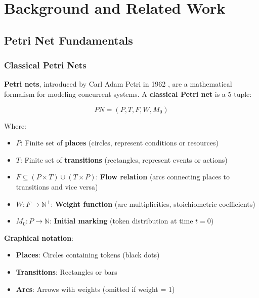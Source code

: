 \chapter{Background and Related Work}
\label{ch:background}

\section{Petri Net Fundamentals}
\label{sec:pn-fundamentals}

\subsection{Classical Petri Nets}
\label{subsec:classical-pn}

\textbf{Petri nets}, introduced by Carl Adam Petri in 1962 \citep{Petri1962}, are a mathematical formalism for modeling concurrent systems. A \textbf{classical Petri net} is a 5-tuple:

\begin{equation}
PN = (P, T, F, W, M_0)
\end{equation}

Where:

\begin{itemize}
    \item $P$: Finite set of \textbf{places} (circles, represent conditions or resources)
    \item $T$: Finite set of \textbf{transitions} (rectangles, represent events or actions)
    \item $F \subseteq (P \times T) \cup (T \times P)$: \textbf{Flow relation} (arcs connecting places to transitions and vice versa)
    \item $W: F \to \mathbb{N}^+$: \textbf{Weight function} (arc multiplicities, stoichiometric coefficients)
    \item $M_0: P \to \mathbb{N}$: \textbf{Initial marking} (token distribution at time $t=0$)
\end{itemize}

\textbf{Graphical notation}:

\begin{itemize}
    \item \textbf{Places}: Circles containing tokens (black dots)
    \item \textbf{Transitions}: Rectangles or bars
    \item \textbf{Arcs}: Arrows with weights (omitted if weight = 1)
\end{itemize}

